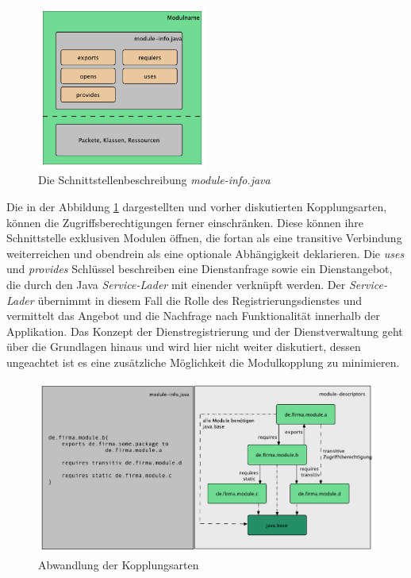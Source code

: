     \begin{figure}[h!]
      \centering
      \includegraphics[width=0.5\textwidth]{material/images/module-info.pdf}
      \caption{Die Schnittstellenbeschreibung \textit{module-info.java}}
      \label{fig:module-info}
    \end{figure}

    Die in der Abbildung \ref{fig:module-info} dargestellten und vorher diskutierten Kopplungsarten, können die Zugriffsberechtigungen ferner einschränken. Diese können ihre Schnittstelle exklusiven Modulen öffnen, die fortan als eine transitive Verbindung weiterreichen und obendrein als eine optionale Abhängigkeit deklarieren. Die \textit{uses} und \textit{provides} Schlüssel beschreiben eine Dienstanfrage sowie ein Dienstangebot, die durch den Java \textit{Service-Lader} mit einender verknüpft werden.\newline
    Der \textit{Service-Lader} übernimmt in diesem Fall die Rolle des Registrierungsdienstes und vermittelt das Angebot und die Nachfrage nach Funktionalität innerhalb der Applikation. Das Konzept der Dienstregistrierung und der Dienstverwaltung geht über die Grundlagen hinaus und wird hier nicht weiter diskutiert, dessen ungeachtet ist es eine zusätzliche Möglichkeit die Modulkopplung zu minimieren. \cite{softModDes,modulMitJava9} \bigbreak

      \begin{figure}[h!]
      \centering
      \includegraphics[width=\textwidth]{material/images/transitiv.pdf}
      \caption{Abwandlung der Kopplungsarten}
      \label{fig:abw-kopl}
  \end{figure}

